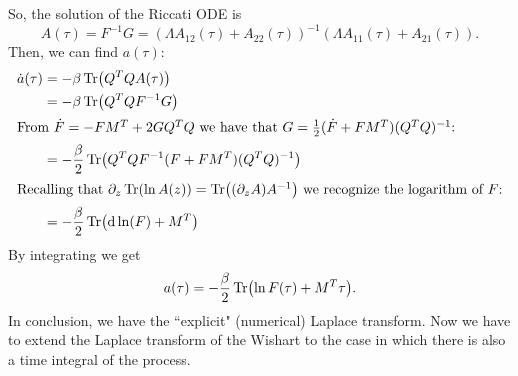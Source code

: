 So, the solution of the Riccati ODE is
\begin{equation}
    A(\tau) = F^{-1}G = (\Lambda A_{12}(\tau) + A_{22}(\tau))^{-1}(\Lambda A_{11}(\tau) + A_{21}(\tau)).
\end{equation}
Then, we can find $a(\tau)$:
\begin{align*}
    \dot{a}(\tau) &= -\beta\Tr(Q^TQA(\tau)) \\
    &=
    -\beta\Tr(Q^TQF^{-1}G) \\
    \intertext{From $\dot{F} = -FM^T + 2GQ^TQ$ we have that $G = \tfrac{1}{2}(\dot{F}+FM^T)(Q^TQ)^{-1}$:}
    &=
    -\frac{\beta}{2}\Tr(Q^TQF^{-1}(F+FM^T)(Q^TQ)^{-1}) \\
    \intertext{Recalling that $\partial_z\Tr(\ln A(z)) = \Tr((\partial_z A)A^{-1})$ we recognize the logarithm of $F$:}
    &=
    -\frac{\beta}{2}\Tr(\dd\ln(F)+M^T)
\end{align*}
By integrating we get
\begin{equation}
    a(\tau) = -\frac{\beta}{2}\Tr(\ln F(\tau) + M^T\tau).
\end{equation}
In conclusion, we have the ``explicit" (numerical) Laplace transform. Now we have to extend the Laplace transform of the Wishart to the case in which there is also a time integral of the process.

